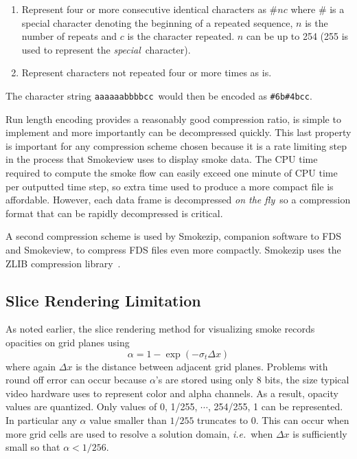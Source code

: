\begin{enumerate}
\item Represent four or more consecutive identical characters as $\# n c$ where $\#$ is a special character denoting the beginning
of a repeated sequence, $n$ is the number of repeats and $c$ is the character repeated.  $n$ can be up to 254 (255 is used to
represent the {\em special}\ character). \item Represent characters not repeated four or more times as is.
\end{enumerate}

The character string {\tt aaaaaabbbbcc}\ would then be encoded as {\tt \#6b\#4bcc}.

Run length encoding provides a reasonably good compression ratio, is simple to implement and more importantly can be decompressed quickly. This last property is important for any compression scheme chosen because it is a rate limiting step in the process that Smokeview uses to display smoke data. The CPU time required to compute the smoke flow can easily exceed one minute of CPU time
per outputted time step, so extra time used to produce a more compact file is affordable. However, each data frame is decompressed {\em on the fly}\ so a compression format that can be rapidly decompressed is critical.

A second compression scheme is used by Smokezip, companion software to FDS and Smokeview, to compress FDS files even more compactly.  Smokezip uses the ZLIB compression library~\cite{ZLIB}.

\subsection{Slice Rendering Limitation}
As noted earlier, the slice rendering method for visualizing smoke records opacities on grid planes using
\begin{equation}
\label{eq:alpha3}
\alpha=1-\exp(-\sigma_t\Delta x)
\end{equation}
where again $\Delta x$ is the distance between adjacent grid planes.  Problems with round off error can occur because $\alpha$'s are stored using only 8 bits, the size typical video hardware uses to represent color and alpha channels.
As a result, opacity values are quantized.  Only values of 0, 1/255, $\cdots$, 254/255, 1 can be represented.  In particular any $\alpha$ value smaller than $1/255$ truncates to 0.
This can occur when more grid cells are used to resolve a solution domain, {\em i.e.}\ when $\Delta x$ is sufficiently small so that $\alpha<1/256$.

